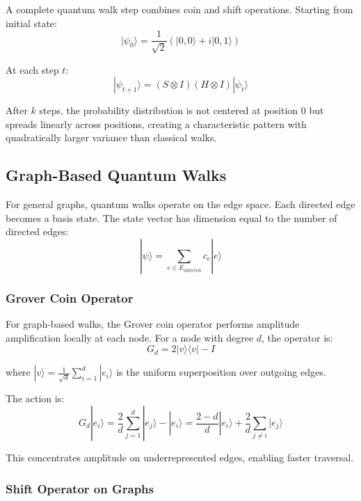 \documentclass[12pt,a4paper]{article}
\begin{document}
A complete quantum walk step combines coin and shift operations. Starting from initial state:
\begin{equation}
|\psi_0\rangle = \frac{1}{\sqrt{2}} (|0, 0\rangle + i|0, 1\rangle)
\end{equation}

At each step $t$:
\begin{equation}
|\psi_{t+1}\rangle = (S \otimes I)(H \otimes I) |\psi_t\rangle
\end{equation}

After $k$ steps, the probability distribution is not centered at position 0 but spreads linearly across positions, creating a characteristic pattern with quadratically larger variance than classical walks.

\subsection{Graph-Based Quantum Walks}

For general graphs, quantum walks operate on the edge space. Each directed edge becomes a basis state. The state vector has dimension equal to the number of directed edges:
\begin{equation}
|\psi\rangle = \sum_{e \in E_{\text{directed}}} c_e |e\rangle
\end{equation}

\subsubsection{Grover Coin Operator}

For graph-based walks, the Grover coin operator performs amplitude amplification locally at each node. For a node with degree $d$, the operator is:
\begin{equation}
G_d = 2|v\rangle\langle v| - I
\end{equation}

where $|v\rangle = \frac{1}{\sqrt{d}} \sum_{i=1}^{d} |e_i\rangle$ is the uniform superposition over outgoing edges.

The action is:
\begin{equation}
G_d |e_i\rangle = \frac{2}{d}\sum_{j=1}^{d} |e_j\rangle - |e_i\rangle = \frac{2 - d}{d}|e_i\rangle + \frac{2}{d}\sum_{j \neq i} |e_j\rangle
\end{equation}

This concentrates amplitude on underrepresented edges, enabling faster traversal.

\subsubsection{Shift Operator on Graphs}
\end{document}
